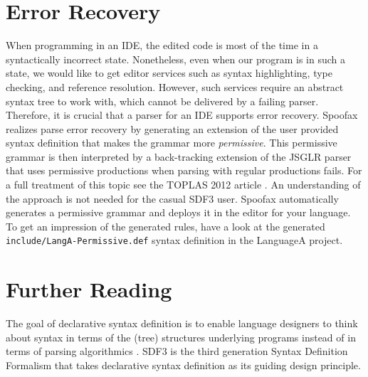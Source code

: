 \section{Error Recovery}

When programming in an IDE, the edited code is most of the time in a
syntactically incorrect state. Nonetheless, even when our program is in such a
state, we would like to get editor services such as syntax highlighting, type
checking, and reference resolution. However, such services require an abstract
syntax tree to work with, which cannot be delivered by a failing parser.
Therefore, it is crucial that a parser for an IDE supports error recovery.
Spoofax realizes parse error recovery by generating an extension of the user
provided syntax definition that makes the grammar more \emph{permissive}. This
permissive grammar is then interpreted by a back-tracking extension of the JSGLR
parser that uses permissive productions when parsing with regular productions
fails. For a full treatment of this topic see the TOPLAS 2012 article
\cite{JongeKVS12}. An understanding of the approach is not needed for the
casual SDF3 user. Spoofax automatically generates a permissive grammar and
deploys it in the editor for your language. To get an impression of the
generated rules, have a look at the generated
\texttt{include/LangA-Permissive.def} syntax definition in the LanguageA
project.

\section{Further Reading}

The goal of declarative syntax definition is to enable language designers to
think about syntax in terms of the (tree) structures underlying programs instead
of in terms of parsing algorithmics \cite{KatsVW10}.
SDF3 is the third generation Syntax Definition Formalism that takes declarative
syntax definition as its guiding design principle.

